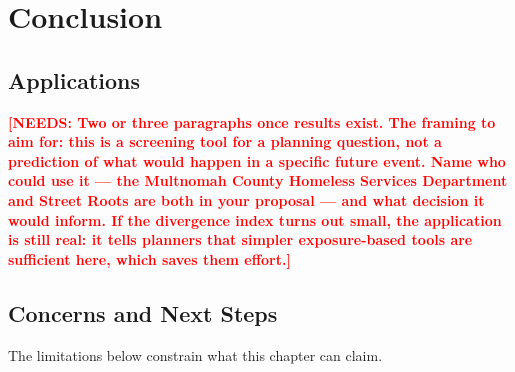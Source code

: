 \documentclass[graybox]{svmult}
\newcommand{\NEEDS}[1]{\textcolor{red}{\textbf{[NEEDS: #1]}}}
\begin{document}
\section{Conclusion}
\label{sec:5}

\subsection{Applications}

\NEEDS{Two or three paragraphs once results exist. The framing to aim for: this
is a screening tool for a planning question, not a prediction of what would
happen in a specific future event. Name who could use it --- the Multnomah County
Homeless Services Department and Street Roots are both in your proposal --- and
what decision it would inform. If the divergence index turns out small, the
application is still real: it tells planners that simpler exposure-based tools
are sufficient here, which saves them effort.}

\subsection{Concerns and Next Steps}

The limitations below constrain what this chapter can claim.
\end{document}

